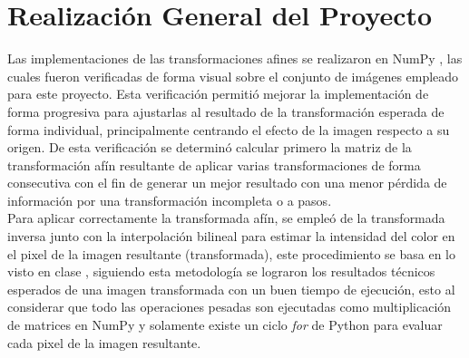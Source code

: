\section{Realización General del Proyecto}
    Las implementaciones de las transformaciones afines se realizaron en NumPy \parencite{numpy_library}, 
    las cuales fueron verificadas de forma visual sobre el conjunto de imágenes empleado 
    para este proyecto. Esta verificación permitió mejorar la implementación de forma progresiva 
    para ajustarlas al resultado de la transformación esperada de forma individual, principalmente centrando el 
    efecto de la imagen respecto a su origen. De esta verificación se determinó calcular primero 
    la matriz de la transformación afín resultante de aplicar varias transformaciones de forma 
    consecutiva con el fin de generar un mejor resultado con una menor pérdida de información por 
    una transformación incompleta o a pasos.\\

    Para aplicar correctamente la transformada afín, se empleó de la transformada inversa 
    junto con la interpolación bilineal para estimar la intensidad del color en el pixel 
    de la imagen resultante (transformada), este procedimiento se basa en lo visto en clase \parencite{tinoco2026pdi}, 
    siguiendo esta metodología se lograron los resultados técnicos esperados de una imagen 
    transformada con un buen tiempo de ejecución, esto al considerar que todo las operaciones 
    pesadas son ejecutadas como multiplicación de matrices en NumPy y solamente existe un 
    ciclo \textit{for} de Python para evaluar cada pixel de la imagen resultante.\\ 